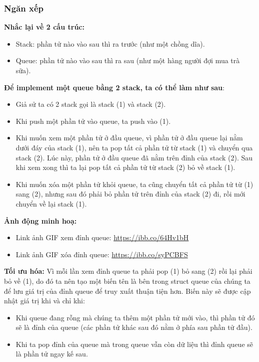 \documentclass[main.tex]{subfiles}
\begin{document}
\subsubsection{Ngăn xếp}
\textbf{Nhắc lại về 2 cấu trúc:}
\begin{itemize}
    \item Stack: phần tử nào vào sau thì ra trước (như một chồng dĩa).
    \item Queue: phần tử nào vào sau thì ra sau (như một hàng người đợi mua trà sữa).
\end{itemize}

\textbf{Để implement một queue bằng 2 stack, ta có thể làm như sau}:
\begin{itemize}
    \item Giả sử ta có 2 stack gọi là stack (1) và stack (2).
    \item Khi push một phần tử vào queue, ta push vào (1).
    \item Khi muốn xem một phần tử ở đầu queue, vì phần tử ở đầu queue lại nằm dưới đáy của stack (1), nên ta pop tất cả phần tử từ stack (1) và chuyển qua stack (2). Lúc này, phần tử ở đầu queue đã nằm trên đỉnh của stack (2). Sau khi xem xong thì ta lại pop tất cả phần tử từ stack (2) bỏ về stack (1).
    \item Khi muốn xóa một phần tử khỏi queue, ta cũng chuyển tất cả phần tử từ (1) sang (2), nhưng sau đó phải bỏ phần tử trên đỉnh của stack (2) đi, rồi mới chuyển về lại stack (1).
\end{itemize}

\textbf{Ảnh động minh hoạ:}
\begin{itemize}
    \item Link ảnh GIF xem đỉnh queue: \href{https://ibb.co/64Hv1bH}{https://ibb.co/64Hv1bH}
    \item Link ảnh GIF xóa đỉnh queue: \href{https://ibb.co/syPCBFS}{https://ibb.co/syPCBFS}
\end{itemize}

\textbf{ Tối ưu hóa:}
Vì mỗi lần xem đỉnh queue ta phải pop (1) bỏ sang (2) rồi lại phải bỏ về (1), do đó ta nên tạo một biến tên là  bên trong struct queue của chúng ta để lưu giá trị của đỉnh queue để truy xuất thuận tiện hơn. Biến này sẽ được cập nhật giá trị khi và chỉ khi:
\begin{itemize}
    \item Khi queue đang rỗng mà chúng ta thêm một phần tử mới vào, thì phần tử đó sẽ là đỉnh của queue (các phần tử khác sau đó nằm ở phía sau phần tử đầu).
    \item Khi ta pop đỉnh của queue mà trong queue vẫn còn dữ liệu thì đỉnh queue sẽ là phần tử ngay kế sau.
\end{itemize}
\end{document}
